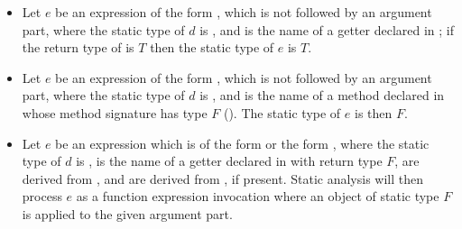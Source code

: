 \documentclass[makeidx]{article}
\begin{document}
{\begin{itemize}
\item
  Let $e$ be an expression of the form ,
  which is not followed by an argument part,
  where the static type of $d$ is \DYNAMIC,
  and \id{} is the name of a getter declared in ;
  if the return type of  is $T$ then
  the static type of $e$ is $T$.

\item
  Let $e$ be an expression of the form ,
  which is not followed by an argument part,
  where the static type of $d$ is \DYNAMIC,
  and \id{} is the name of a method declared in 
  whose method signature has type $F$
  ().
  The static type of $e$ is then $F$.

\item
  Let $e$ be an expression which is of the form
  or the form ,
  where the static type of $d$ is \DYNAMIC,
  \id{} is the name of a getter declared in  with return type $F$,
   are derived from , and
   are derived from , if present.
  Static analysis will then process $e$ as a function expression invocation
  where an object of static type $F$ is applied to the given argument part.


\end{itemize}}
\end{document}
